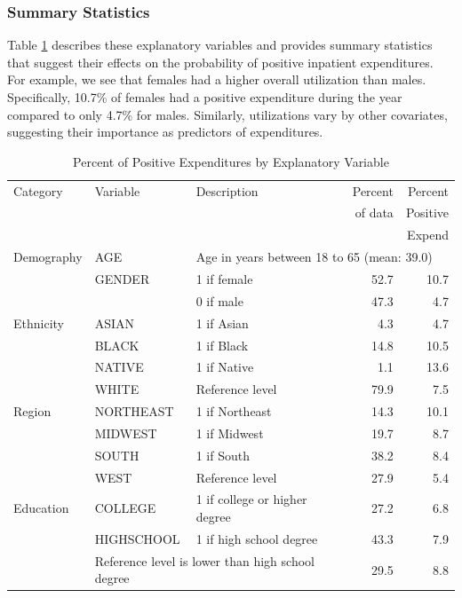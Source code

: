 \subsubsection*{Summary Statistics}

Table \ref{T11:MEPSSumStats} describes these explanatory variables
and provides summary statistics that suggest their effects on the
probability of positive inpatient expenditures. For example, we see
that females had a higher overall utilization than males.
Specifically, 10.7\% of females had a positive expenditure during
the year compared to only 4.7\% for males. Similarly, utilizations
vary by other covariates, suggesting their importance as predictors
of expenditures.

\newpage

\begin{table}[h]
\caption{\label{T11:MEPSSumStats} Percent of Positive Expenditures
by Explanatory Variable}
\begin{center}
\begin{tabular}{lllrr}
\hline
Category & Variable & Description & Percent & Percent \\
&  &  & of data & Positive \\
&  &  &  & Expend \\ \hline
Demography & AGE & \multicolumn{3}{l}{Age in years between 18 to 65 (mean: 39.0)} \\
& GENDER & 1 if female & 52.7 & 10.7  \\
&  & 0 if male & 47.3  &  4.7\\
Ethnicity & ASIAN & 1 if Asian & 4.3 & 4.7  \\
& BLACK & 1 if Black & 14.8 & 10.5 \\
& NATIVE & 1 if Native & 1.1 & 13.6  \\
& WHITE & Reference level & 79.9  &  7.5  \\
Region & NORTHEAST & 1 if Northeast & 14.3 & 10.1 \\
& MIDWEST & 1 if Midwest & 19.7 &  8.7 \\
& SOUTH & 1 if South & 38.2  &  8.4 \\
& WEST & Reference level &27.9  &  5.4 \\
\hline Education & COLLEGE & 1 if college or higher degree & 27.2  & 6.8 \\
& HIGHSCHOOL & 1 if high school degree & 43.3   & 7.9\\
& \multicolumn{2}{l}{Reference level is lower than high school
degree} & 29.5 & 8.8\\ \hline

\end{tabular}
\end{center}
\end{table}
